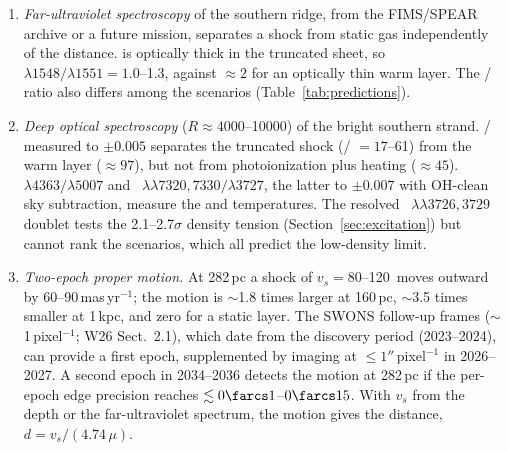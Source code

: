\begin{table}[t]
\end{table}

\begin{enumerate}
\item \textit{Far-ultraviolet spectroscopy} of the southern ridge, from the FIMS/SPEAR archive \citep{Kim2007} or a future mission, separates a shock from static gas independently of the distance.  is optically thick in the truncated sheet, so $\lambda1548/\lambda1551=1.0$--1.3, against $\approx2$ for an optically thin warm layer. The /\Oiii{} ratio also differs among the scenarios (Table~\ref{tab:predictions}).

\item \textit{Deep optical spectroscopy} ($R\approx4000$--10000) of the bright southern strand. \Hb/\Oiii{} measured to $\pm0.005$ separates the truncated shock (\Oiii/\Hb{} $=17$--61) from the warm layer ($\approx97$), but not from photoionization plus heating ($\approx45$). \Oiii~$\lambda4363/\lambda5007$ and \Oii~$\lambda\lambda7320,7330/\lambda3727$, the latter to $\pm0.007$ with OH-clean sky subtraction, measure the \Oiii{} and \Oii{} temperatures. The resolved \Oii~$\lambda\lambda3726,3729$ doublet tests the 2.1--2.7$\sigma$ density tension (Section~\ref{sec:excitation}) but cannot rank the scenarios, which all predict the low-density limit.

\item \textit{Two-epoch \Oiii{} proper motion.} At 282\,pc a shock of $v_s=80$--120\,\kms{} moves outward by 60--90\,mas\,yr$^{-1}$; the motion is $\sim$1.8 times larger at 160\,pc, $\sim$3.5 times smaller at 1\,kpc, and zero for a static layer. The SWONS follow-up frames ($\sim$1\,pixel$^{-1}$; W26 Sect.~2.1), which date from the discovery period (2023--2024), can provide a first epoch, supplemented by imaging at $\le1''$\,pixel$^{-1}$ in 2026--2027. A second epoch in 2034--2036 detects the motion at 282\,pc if the per-epoch edge precision reaches $\lesssim0\farcs1$--$0\farcs15$. With $v_s$ from the \Hb{} depth or the far-ultraviolet spectrum, the motion gives the distance, $d=v_s/(4.74\,\mu)$.


\end{enumerate}
